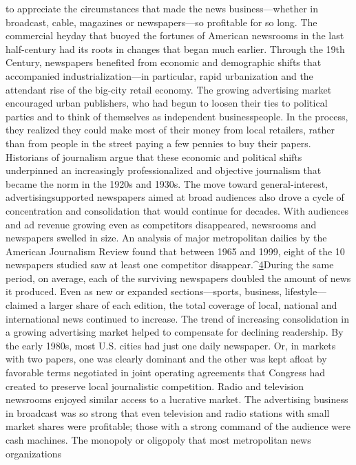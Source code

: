 to appreciate the circumstances that made the news business—whether
in broadcast, cable, magazines or newspapers—so profitable for so long. The
commercial heyday that buoyed the fortunes of American newsrooms in the last
half-century had its roots in changes that began much earlier.
Through the 19th Century, newspapers benefited from economic and demographic
shifts that accompanied industrialization—in particular, rapid urbanization
and the attendant rise of the big-city retail economy. The growing advertising
market encouraged urban publishers, who had begun to loosen their ties to
political parties and to think of themselves as independent businesspeople. In the
process, they realized they could make most of their money from local retailers,
rather than from people in the street paying a few pennies to buy their papers.
Historians of journalism argue that these economic and political shifts underpinned
an increasingly professionalized and objective journalism that became the
norm in the 1920s and 1930s. The move toward general-interest, advertisingsupported
newspapers aimed at broad audiences also drove a cycle of concentration
and consolidation that would continue for decades.
With audiences and ad revenue growing even as competitors disappeared,
newsrooms and newspapers swelled in size. An analysis of major metropolitan
dailies by the American Journalism Review found that between 1965 and 1999,
eight of the 10 newspapers studied saw at least one competitor disappear.^{\href{#endnotes-chapter-1}{4}}During
the same period, on average, each of the surviving newspapers doubled the
amount of news it produced. Even as new or expanded sections—sports, business,
lifestyle—claimed a larger share of each edition, the total coverage of local,
national and international news continued to increase.
The trend of increasing consolidation in a growing advertising market helped
to compensate for declining readership. By the early 1980s, most U.S. cities had
just one daily newspaper. Or, in markets with two papers, one was clearly dominant
and the other was kept afloat by favorable terms negotiated in joint operating
agreements that Congress had created to preserve local journalistic competition.
Radio and television newsrooms enjoyed similar access to a lucrative
market. The advertising business in broadcast was so strong that even television
and radio stations with small market shares were profitable; those with a strong
command of the audience were cash machines.
The monopoly or oligopoly that most metropolitan news organizations
